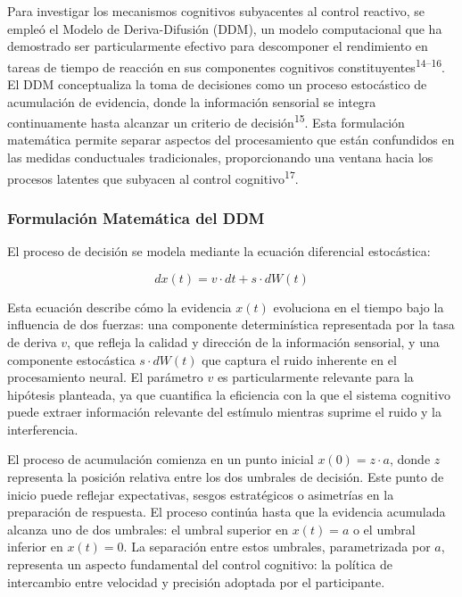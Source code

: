 \documentclass[
  spanish,
  10pt,
]{article}
\begin{document}
Para investigar los mecanismos cognitivos subyacentes al control
reactivo, se empleó el Modelo de Deriva-Difusión (DDM), un modelo
computacional que ha demostrado ser particularmente efectivo para
descomponer el rendimiento en tareas de tiempo de reacción en sus
componentes cognitivos constituyentes\textsuperscript{14--16}. El DDM
conceptualiza la toma de decisiones como un proceso estocástico de
acumulación de evidencia, donde la información sensorial se integra
continuamente hasta alcanzar un criterio de
decisión\textsuperscript{15}. Esta formulación matemática permite
separar aspectos del procesamiento que están confundidos en las medidas
conductuales tradicionales, proporcionando una ventana hacia los
procesos latentes que subyacen al control cognitivo\textsuperscript{17}.

\subsubsection{Formulación Matemática del
DDM}\label{formulaciuxf3n-matemuxe1tica-del-ddm}

El proceso de decisión se modela mediante la ecuación diferencial
estocástica:

\[dx(t) = v \cdot dt + s \cdot dW(t)\]

Esta ecuación describe cómo la evidencia \(x(t)\) evoluciona en el
tiempo bajo la influencia de dos fuerzas: una componente determinística
representada por la tasa de deriva \(v\), que refleja la calidad y
dirección de la información sensorial, y una componente estocástica
\(s \cdot dW(t)\) que captura el ruido inherente en el procesamiento
neural. El parámetro \(v\) es particularmente relevante para la
hipótesis planteada, ya que cuantifica la eficiencia con la que el
sistema cognitivo puede extraer información relevante del estímulo
mientras suprime el ruido y la interferencia.

El proceso de acumulación comienza en un punto inicial
\(x(0) = z \cdot a\), donde \(z\) representa la posición relativa entre
los dos umbrales de decisión. Este punto de inicio puede reflejar
expectativas, sesgos estratégicos o asimetrías en la preparación de
respuesta. El proceso continúa hasta que la evidencia acumulada alcanza
uno de dos umbrales: el umbral superior en \(x(t) = a\) o el umbral
inferior en \(x(t) = 0\). La separación entre estos umbrales,
parametrizada por \(a\), representa un aspecto fundamental del control
cognitivo: la política de intercambio entre velocidad y precisión
adoptada por el participante.
\end{document}
